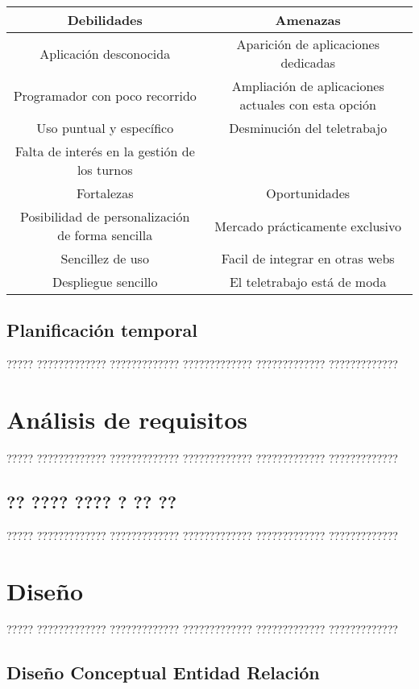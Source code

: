 \documentclass[11pt,spanish,listoffigures,listoftables]{tfgetsinf}
\begin{document}
\begin{tabular}{| c | c |}
\hline
Debilidades & Amenazas \\ \hline
Aplicación desconocida & Aparición de aplicaciones dedicadas \\
Programador con poco recorrido & Ampliación de aplicaciones actuales con esta opción \\
Uso puntual y específico & Desminución del teletrabajo\\
Falta de interés en la gestión de los turnos &  \\ \hline   
Fortalezas & Oportunidades \\ \hline
Posibilidad de personalización de forma sencilla & Mercado prácticamente exclusivo \\
Sencillez de uso &  Facil de integrar en otras webs\\
Despliegue sencillo & El teletrabajo está de moda\\ 
\end{tabular}

\section{Planificación temporal}

????? ????????????? ????????????? ????????????? ????????????? ?????????????

\chapter{Análisis de requisitos}

????? ????????????? ????????????? ????????????? ????????????? ????????????? 

\section{?? ???? ???? ? ?? ??}

????? ????????????? ????????????? ????????????? ????????????? ?????????????

\chapter{Diseño}

????? ????????????? ????????????? ????????????? ????????????? ????????????? 

\section{Diseño Conceptual Entidad Relación}
\end{document}
